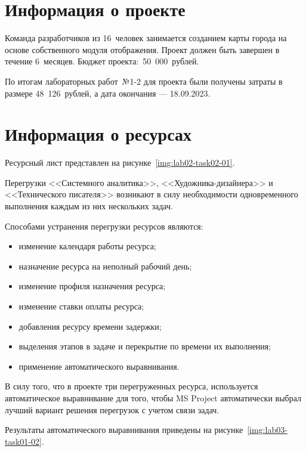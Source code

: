 \section{Информация о проекте}

Команда разработчиков из 16~человек занимается созданием карты города на основе
собственного модуля отображения. Проект должен быть завершен в течение
6~месяцев. Бюджет проекта:~50~000~рублей.

По итогам лабораторных работ~№1-2 для проекта были получены затраты в
размере 48~126~рублей, а дата окончания --- 18.09.2023.

\section{Информация о ресурсах}

Ресурсный лист представлен на рисунке~\ref{img:lab02-task02-01}.


Перегрузки <<Системного аналитика>>, <<Художника-дизайнера>> и <<Технического
писателя>> возникают в силу необходимости одновременного выполнения каждым из
них нескольких задач.

Способами устранения перегрузки ресурсов являются:
\begin{itemize}
    \item изменение календаря работы ресурса;
    \item назначение ресурса на неполный рабочий день;
    \item изменение профиля назначения ресурса;
    \item изменение ставки оплаты ресурса;
    \item добавления ресурсу времени задержки;
    \item выделения этапов в задаче и перекрытие по времени их выполнения;
    \item применение автоматического выравнивания.
\end{itemize}

В силу того, что в проекте три перегруженных ресурса, используется
автоматическое выравнивание для того, чтобы MS Project автоматически выбрал
лучший вариант решения перегрузок с учетом связи задач.

Результаты автоматического выравнивания приведены на
рисунке~\ref{img:lab03-task01-02}.


